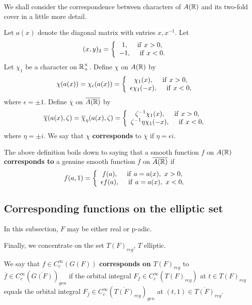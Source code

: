 We shall consider the correspondence between characters of
$A({\Bbb{R}})$ and its two-fold cover in a little more
detail.

Let $a(x)$ denote the diagonal matrix with entries $x,x^{-1}$.
Let
\[
(x,y)_2=
\left\{
\begin{array}{c}
1,\ \ \ \ {\rm if \ }x>0,\\
-1,\ \ \ \ {\rm if \ }x<0.
\end{array}
\right.
\]
Let $\chi_1$ be a character on ${\Bbb{R}}_+^\times$. Define
$\chi$ on $A({\Bbb{R}})$ by
\[
\chi(a(x))=\chi_\epsilon(a(x))
=
\left\{
\begin{array}{c}
\chi_1(x),\ \ \ \ {\rm if \ }x>0,\\
\epsilon \chi_1(-x),\ \ \ \ {\rm if \ }x<0,
\end{array}
\right.
\]
where $\epsilon =\pm 1$. Define
$\overline{\chi}$ on $\overline{A({\Bbb{R}})}$ by
\[
\overline{\chi}(a(x),\zeta)=\overline{\chi}_\eta(a(x),\zeta)
=
\left\{
\begin{array}{c}
\zeta^{-1}\chi_1(x),\ \ \ \ {\rm if \ }x>0,\\
\zeta^{-1}\eta \chi_1(-x),\ \ \ \ {\rm if \ }x<0,
\end{array}
\right.
\]
where $\eta=\pm i$. We say that
$\chi$ {\bf corresponds} to $\overline{\chi}$ if
$\eta =\epsilon i$.

The above definition boils down to saying that
a smooth function $f$ on $A({\Bbb{R}})$
{\bf corresponds to} a genuine smooth function
$\overline{f}$ on $\overline{A({\Bbb{R}})}$ if
\begin{equation}
f(a,1)=
\left\{
\begin{array}{c}
f(a),\ \ \ \ {\rm if \ }a=a(x),\ x>0,\\
\epsilon f(a),\ \ \ \ {\rm if \ }a=a(x),\ x<0,
\end{array}
\right.
\end{equation}

\subsection{Corresponding functions on the elliptic set}

In this subsection, $F$ may be either real or p-adic.

Finally, we concentrate on the set $T(F)_{reg}$, $T$ elliptic.

\begin{definition} We say that
$f \in C_c^\infty(G(F))$ {\bf corresponds on $T(F)_{reg}$} to
$\overline{f}\in C_c^\infty(\overline{G(F)})_{gen}$
if the orbital integral $F_f\in C_c^\infty(T(F)_{reg})$
at $t\in T(F)_{reg}$ equals the orbital integral
$F_{\overline{f}}\in C_c^\infty(\overline{T(F)}_{reg})_{gen}$
at $(t,1)\in \overline{T(F)}_{reg}$.
\end{definition}


